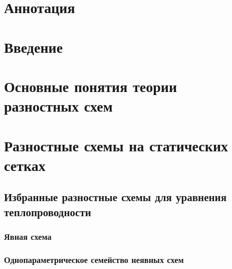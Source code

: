 \documentclass[a4paper, 14pt]{article}
\begin{document}
    
    

    \section*{Аннотация}
    
    \newpage

    \tableofcontents
    \newpage

    \section{Введение}
    

    \section{Основные понятия теории разностных схем}\label{sec:MainDiffSchemes}
    

    \section{Разностные схемы на статических сетках}\label{sec:StaticGrid}
        

        \subsection{Избранные разностные схемы для уравнения теплопроводности}
            \subsubsection{Явная схема}
            
            \subsubsection{Однопараметрическое семейство неявных схем}
            
\end{document}
